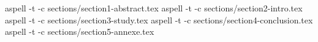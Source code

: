 aspell -t -c sections/section1-abstract.tex
aspell -t -c sections/section2-intro.tex
aspell -t -c sections/section3-study.tex
aspell -t -c sections/section4-conclusion.tex
aspell -t -c sections/section5-annexe.tex
